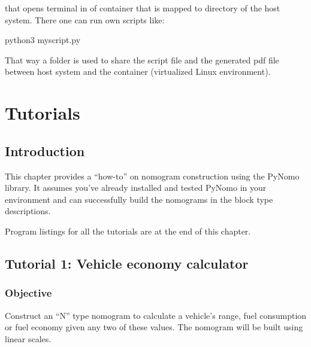 \documentclass[a4paper,11pt,english]{sphinxmanual}
\begin{document}
that opens terminal in  of container that is mapped to directory  of the host system.
There one can run own scripts like:

\begin{sphinxVerbatim}[commandchars=\\\{\},formatcom=\scriptsize]
\PYGZdl{} python3 my\PYGZus{}script.py
\end{sphinxVerbatim}

That way a folder is used to share the script file and the generated pdf file between host system and the container (virtualized
Linux environment).


\chapter{Tutorials}
\label{\detokenize{tutorials/tutorials:tutorials}}\label{\detokenize{tutorials/tutorials::doc}}

\section{Introduction}
\label{\detokenize{tutorials/tutorials:introduction}}
This chapter provides a “how-to” on nomogram construction using the PyNomo library.  It assumes you’ve already installed and tested  PyNomo in your environment and can successfully build the nomograms in the block type descriptions.

Program listings for all the tutorials are at the end of this chapter.


\section{Tutorial 1: Vehicle economy calculator}
\label{\detokenize{tutorials/tutorials:tutorial-1-vehicle-economy-calculator}}

\subsection{Objective}
\label{\detokenize{tutorials/tutorials:objective}}
Construct an “N” type nomogram to calculate a vehicle’s range, fuel consumption or fuel economy given any two of these values.  The nomogram will be built using linear scales.
\end{document}
